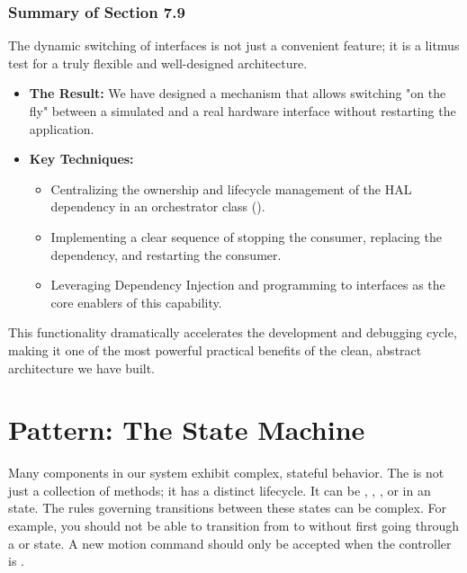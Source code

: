 \subsubsection{Summary of Section 7.9}
\label{subsubsec:section7_9_summary}
The dynamic switching of interfaces is not just a convenient feature; it is a litmus test for a truly flexible and well-designed architecture.
\begin{itemize}
    \item \textbf{The Result:} We have designed a mechanism that allows switching "on the fly" between a simulated and a real hardware interface without restarting the application.
    \item \textbf{Key Techniques:}
    \begin{itemize}
        \item Centralizing the ownership and lifecycle management of the HAL dependency in an orchestrator class ().
        \item Implementing a clear sequence of stopping the consumer, replacing the dependency, and restarting the consumer.
        \item Leveraging Dependency Injection and programming to interfaces as the core enablers of this capability.
    \end{itemize}
\end{itemize}
This functionality dramatically accelerates the development and debugging cycle, making it one of the most powerful practical benefits of the clean, abstract architecture we have built.








\section{Pattern: The State Machine}
\label{sec:pattern_state_machine}

Many components in our system exhibit complex, stateful behavior. The  is not just a collection of methods; it has a distinct lifecycle. It can be , , , or in an  state. The rules governing transitions between these states can be complex. For example, you should not be able to transition from  to  without first going through a  or  state. A new motion command should only be accepted when the controller is .

